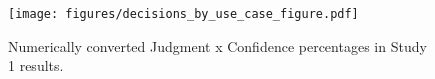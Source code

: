 \begin{figure}
    \centering
    \texttt{[image: figures/decisions\_by\_use\_case\_figure.pdf]}
    \caption{Numerically converted Judgment x Confidence percentages in Study 1 results. }
    \label{fig:decisions-by-use-case}
\end{figure}